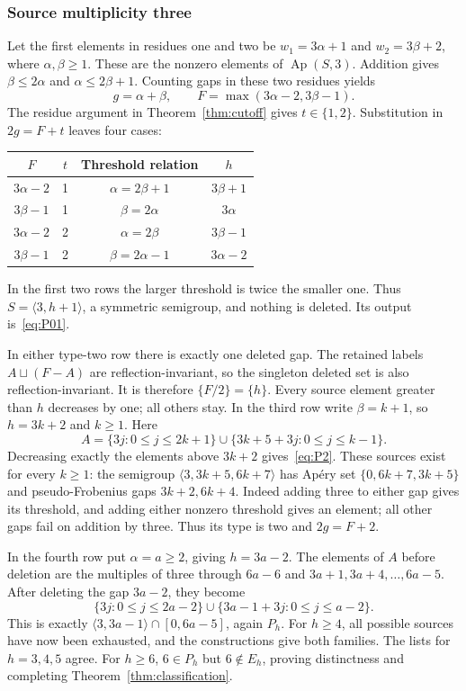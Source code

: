 \documentclass[11pt,a4paper]{article}
\theoremstyle{definition}
\theoremstyle{remark}
\newcommand{\Ap}{\operatorname{Ap}}
\begin{document}
\subsubsection{Source multiplicity three}
Let the first elements in residues one and two be
$w_1=3\alpha+1$ and $w_2=3\beta+2$, where $\alpha,\beta\geq1$.
These are the nonzero elements of $\Ap(S,3)$.
Addition gives $\beta\leq2\alpha$ and $\alpha\leq2\beta+1$.
Counting gaps in these two residues yields
\[
 g=\alpha+\beta,\qquad
 F=\max(3\alpha-2,3\beta-1).
\]
The residue argument in Theorem~\ref{thm:cutoff} gives $t\in\{1,2\}$.
Substitution in $2g=F+t$ leaves four cases:
\begin{center}
\begin{tabular}{cccc}
\toprule
$F$ & $t$ & Threshold relation & $h$\\
\midrule
$3\alpha-2$ & 1 & $\alpha=2\beta+1$ & $3\beta+1$\\
$3\beta-1$ & 1 & $\beta=2\alpha$ & $3\alpha$\\
$3\alpha-2$ & 2 & $\alpha=2\beta$ & $3\beta-1$\\
$3\beta-1$ & 2 & $\beta=2\alpha-1$ & $3\alpha-2$\\
\bottomrule
\end{tabular}
\end{center}
In the first two rows the larger threshold is twice the smaller one.
Thus $S=\langle3,h+1\rangle$, a symmetric semigroup, and nothing is
deleted. Its output is~\eqref{eq:P01}.

In either type-two row there is exactly one deleted gap. The retained
labels $A\sqcup(F-A)$ are reflection-invariant, so the singleton deleted
set is also reflection-invariant. It is therefore $\{F/2\}=\{h\}$.
Every source element greater than $h$ decreases by one; all others stay.
In the third row write $\beta=k+1$, so $h=3k+2$ and $k\geq1$.
Here
\[
 A=\{3j:0\leq j\leq2k+1\}
   \cup\{3k+5+3j:0\leq j\leq k-1\}.
\]
Decreasing exactly the elements above $3k+2$ gives~\eqref{eq:P2}.
These sources exist for every $k\geq1$: the semigroup
$\langle3,3k+5,6k+7\rangle$ has Ap\'ery set
$\{0,6k+7,3k+5\}$ and pseudo-Frobenius gaps $3k+2,6k+4$.
Indeed adding three to either gap gives its threshold, and adding either
nonzero threshold gives an element; all other gaps fail on addition by
three. Thus its type is two and $2g=F+2$.

In the fourth row put $\alpha=a\geq2$, giving $h=3a-2$.
The elements of $A$ before deletion are the multiples of three through $6a-6$
and $3a+1,3a+4,\ldots,6a-5$. After deleting the gap $3a-2$, they become
\[
 \{3j:0\leq j\leq2a-2\}
 \cup\{3a-1+3j:0\leq j\leq a-2\}.
\]
This is exactly $\langle3,3a-1\rangle\cap[0,6a-5]$, again $P_h$.
For $h\geq4$, all possible sources have now been exhausted, and the constructions give
both families. The lists for $h=3,4,5$ agree. For $h\geq6$, $6\in P_h$
but $6\notin E_h$, proving distinctness and completing
Theorem~\ref{thm:classification}.
\end{document}
